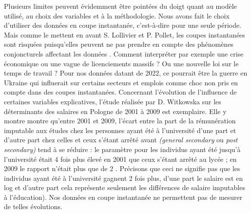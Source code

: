 \documentclass[a4paper, french, 11 pt]{article}\usepackage[]{graphicx}\usepackage[]{xcolor}
\begin{document}
        Plusieurs limites peuvent évidemment être pointées du doigt quant au modèle utilisé, au choix des variables et à la méthodologie. Nous avons fait le choix d’utiliser des données en coupe instantanée, c’est-à-dire pour une seule période. Mais comme le mettent en avant S. Lollivier et P. Pollet, les coupes instantanées sont risquées puisqu’elles peuvent ne pas prendre en compte des phénomènes conjoncturels affectant les données \parencite{lollivier2003}. Comment interpréter par exemple une crise économique ou une vague de licenciements massifs ? Ou une nouvelle loi sur le temps de travail ? Pour nos données datant de 2022, ce pourrait être la guerre en Ukraine qui influerait sur certains secteurs et emplois comme choc non pris en compte dans des coupes instantanées. Concernant l’évolution de l’influence de certaines variables explicatives, l'étude réalisée par D. Witkowska sur les déterminants des salaires en Pologne de 2001 à 2009 est exemplaire. Elle y montre montre qu'entre 2001 et 2009, l'écart entre la part de la rémunération imputable aux études chez les personnes ayant été à l'université d'une part et d'autre part chez celles et ceux s’étant arrêté avant \textit{(general secondary} ou \textit{post secondary)} tend à se réduire : le paramètre pour les individus ayant été jusqu’à l’université était 4 fois plus élevé en 2001 que ceux s’étant arrêté au lycée ; en 2009 le rapport n’était plus que de 2 \parencite{witkowska2014}. Précisons que ceci ne signifie pas que les individus ayant été à l’université gagnent 2 fois plus, d’une part le salaire est en log et d’autre part cela représente seulement les différences de salaire imputables à l’éducation). Nos données en coupe instantanée ne permettent pas de mesurer de telles évolutions. 
        
\end{document}
